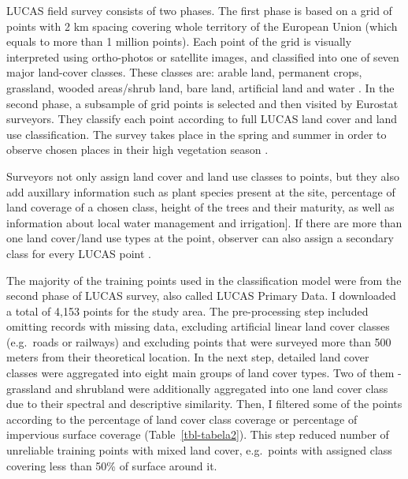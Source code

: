 \documentclass{amuthesis}
\begin{document}
LUCAS field survey consists of two phases. The first phase is based on a
grid of points with 2 km spacing covering whole territory of the
European Union (which equals to more than 1 million points). Each point
of the grid is visually interpreted using ortho-photos or satellite
images, and classified into one of seven major land-cover classes. These
classes are: arable land, permanent crops, grassland, wooded areas/shrub
land, bare land, artificial land and water
\autocite{oliver_buck_analysis_2015}. In the second phase, a subsample
of grid points is selected and then visited by Eurostat surveyors. They
classify each point according to full LUCAS land cover and land use
classification. The survey takes place in the spring and summer in order
to observe chosen places in their high vegetation season
\autocite{dandrimont_harmonised_2020}.

Surveyors not only assign land cover and land use classes to points, but
they also add auxillary information such as plant species present at the
site, percentage of land coverage of a chosen class, height of the trees
and their maturity, as well as information about local water management
and irrigation{]}. If there are more than one land cover/land use types
at the point, observer can also assign a secondary class for every LUCAS
point \autocite{oliver_buck_analysis_2015}.

The majority of the training points used in the classification model
were from the second phase of LUCAS survey, also called LUCAS Primary
Data. I downloaded a total of 4,153 points for the study area. The
pre-processing step included omitting records with missing data,
excluding artificial linear land cover classes (e.g.~roads or railways)
and excluding points that were surveyed more than 500 meters from their
theoretical location. In the next step, detailed land cover classes were
aggregated into eight main groups of land cover types. Two of them -
grassland and shrubland were additionally aggregated into one land cover
class due to their spectral and descriptive similarity. Then, I filtered
some of the points according to the percentage of land cover class
coverage or percentage of impervious surface coverage
(Table~\ref{tbl-tabela2}). This step reduced number of unreliable
training points with mixed land cover, e.g.~points with assigned class
covering less than 50\% of surface around it.
\end{document}

